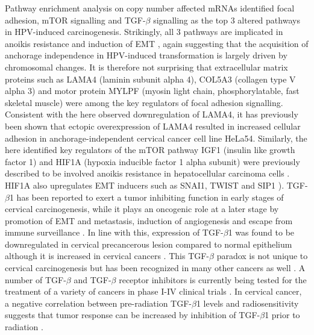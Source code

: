Pathway enrichment analysis on copy number affected mRNAs identified focal adhesion, mTOR signalling and TGF-$\beta$ signalling as the top 3 altered pathways in HPV-induced carcinogenesis. Strikingly, all 3 pathways are implicated in anoikis resistance and induction of EMT \cite{Paoli2013, Frisch2013, Garofalo2012}, again suggesting that the acquisition of anchorage independence in HPV-induced transformation is largely driven by chromosomal changes. It is therefore not surprising that extracellular matrix proteins such as LAMA4 (laminin subunit alpha 4), COL5A3 (collagen type V alpha 3) and motor protein MYLPF (myosin light chain, phosphorylatable, fast skeletal muscle) were among the key regulators of focal adhesion signalling. Consistent with the here observed downregulation of LAMA4, it has previously been shown that ectopic overexpression of LAMA4 resulted in increased cellular adhesion in anchorage-independent cervical cancer cell line HeLa54. Similarly, the here identified key regulators of the mTOR pathway IGF1 (insulin like growth factor 1) and HIF1A (hypoxia inducible factor 1 alpha subunit) were previously described to be involved anoikis resistance in hepatocellular carcinoma cells \cite{Tang2015, Sun2014}. HIF1A also upregulates EMT inducers such as SNAI1, TWIST and SIP1 \cite{Luo2011, Yang2008, Evans2007}). TGF-$\beta$1 has been reported to exert a tumor inhibiting function in early stages of cervical carcinogenesis, while it plays an oncogenic role at a later stage by promotion of EMT and metastasis, induction of angiogenesis and escape from immune surveillance \cite{Zhu2016}. In line with this, expression of TGF-$\beta$1 was found to be downregulated in cervical precancerous lesion compared to normal epithelium although it is increased in cervical cancers \cite{Wu2002, Hou2012, Fan2014}. This TGF-$\beta$ paradox is not unique to cervical carcinogenesis but has been recognized in many other cancers as well \cite{Massague2008, Neuzillet2015, Shen2017}. A number of TGF-$\beta$ and TGF-$\beta$ receptor inhibitors is currently being tested for the treatment of a variety of cancers in phase I-IV clinical trials \cite{Colak2017}. In cervical cancer, a negative correlation between pre-radiation TGF-$\beta$1 levels and radiosensitivity suggests that tumor response can be increased by inhibition of TGF-$\beta$1 prior to radiation \cite{Zhu2016}.

